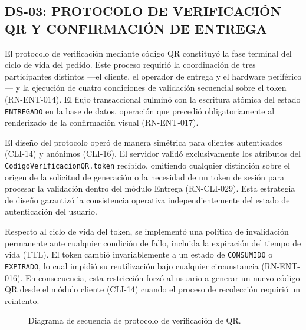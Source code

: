 \subsection{DS-03: PROTOCOLO DE VERIFICACIÓN QR Y CONFIRMACIÓN DE ENTREGA}
El protocolo de verificación mediante código QR constituyó la fase terminal del ciclo de vida del pedido. Este proceso requirió la coordinación de tres participantes distintos —el cliente, el operador de entrega y el hardware periférico— y la ejecución de cuatro condiciones de validación secuencial sobre el token (RN-ENT-014). El flujo transaccional culminó con la escritura atómica del estado \texttt{ENTREGADO} en la base de datos, operación que precedió obligatoriamente al renderizado de la confirmación visual (RN-ENT-017).

El diseño del protocolo operó de manera simétrica para clientes autenticados (CLI-14) y anónimos (CLI-16). El servidor validó exclusivamente los atributos del \texttt{CodigoVerificacionQR.token} recibido, omitiendo cualquier distinción sobre el origen de la solicitud de generación o la necesidad de un token de sesión para procesar la validación dentro del módulo Entrega (RN-CLI-029). Esta estrategia de diseño garantizó la consistencia operativa independientemente del estado de autenticación del usuario.

Respecto al ciclo de vida del token, se implementó una política de invalidación permanente ante cualquier condición de fallo, incluida la expiración del tiempo de vida (TTL). El token cambió invariablemente a un estado de \texttt{CONSUMIDO} o \texttt{EXPIRADO}, lo cual impidió su reutilización bajo cualquier circunstancia (RN-ENT-016). En consecuencia, esta restricción forzó al usuario a generar un nuevo código QR desde el módulo cliente (CLI-14) cuando el proceso de recolección requirió un reintento.

\begin{landscape}
\begin{figure}[H]
    \centering
    
    \caption{Diagrama de secuencia de protocolo de verificación de QR.}
    \label{fig:diagrama-secuencia-verificacion-qr}
\end{figure}
\end{landscape}

